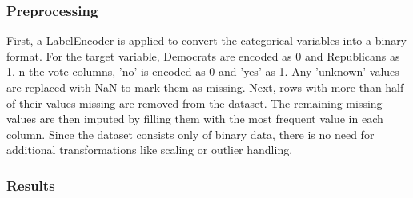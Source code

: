 \documentclass{article}
\begin{document}
\subsubsection{Preprocessing}
First, a LabelEncoder is applied to convert the categorical variables into a binary format.  For the target variable, Democrats are encoded as 0 and Republicans as 1.  n the vote columns, 'no' is encoded as 0 and 'yes' as 1. Any 'unknown' values are replaced with NaN to mark them as missing. Next, rows with more than half of their values missing are removed from the dataset. The remaining missing values are then imputed by filling them with the most frequent value in each column. Since the dataset consists only of binary data, there is no need for additional transformations like scaling or outlier handling. 

\subsubsection{Results}
\end{document}
